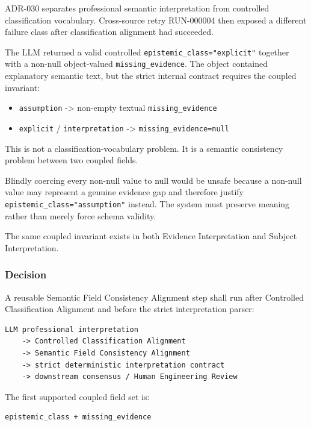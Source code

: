 ADR-030 separates professional semantic interpretation from controlled classification vocabulary. Cross-source retry RUN-000004 then exposed a different failure class after classification alignment had succeeded.

The LLM returned a valid controlled \texttt{epistemic\_class="explicit"} together with a non-null object-valued \texttt{missing\_evidence}. The object contained explanatory semantic text, but the strict internal contract requires the coupled invariant:

\begin{itemize}
\tightlist
\item
  \texttt{assumption} -\textgreater{} non-empty textual \texttt{missing\_evidence}
\item
  \texttt{explicit} / \texttt{interpretation} -\textgreater{} \texttt{missing\_evidence=null}
\end{itemize}

This is not a classification-vocabulary problem. It is a semantic consistency problem between two coupled fields.

Blindly coercing every non-null value to null would be unsafe because a non-null value may represent a genuine evidence gap and therefore justify \texttt{epistemic\_class="assumption"} instead. The system must preserve meaning rather than merely force schema validity.

The same coupled invariant exists in both Evidence Interpretation and Subject Interpretation.

\hypertarget{decision-17}{%
\subsubsection{Decision}\label{decision-17}}

A reusable Semantic Field Consistency Alignment step shall run after Controlled Classification Alignment and before the strict interpretation parser:

\begin{verbatim}
LLM professional interpretation
    -> Controlled Classification Alignment
    -> Semantic Field Consistency Alignment
    -> strict deterministic interpretation contract
    -> downstream consensus / Human Engineering Review
\end{verbatim}

The first supported coupled field set is:

\begin{verbatim}
epistemic_class + missing_evidence
\end{verbatim}

